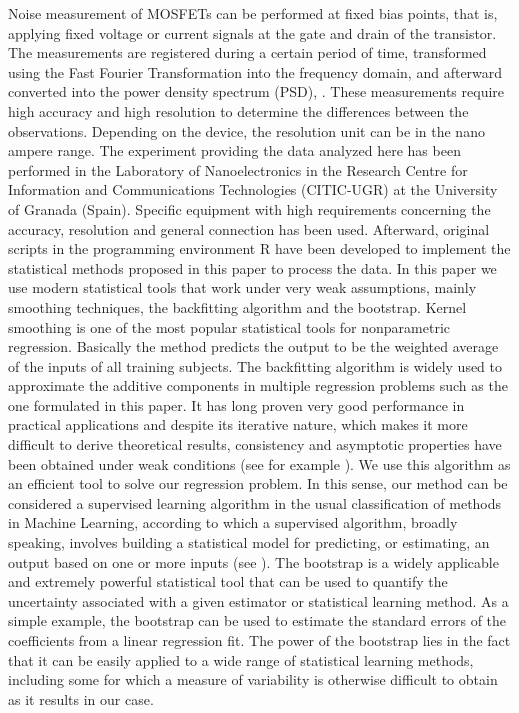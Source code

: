 \documentclass[sn-mathphys]{sn-jnl}%
\theoremstyle{thmstyleone}%
\theoremstyle{thmstyletwo}%
\theoremstyle{thmstylethree}%
\begin{document}
Noise measurement of MOSFETs can be performed at fixed bias points, that is, applying fixed voltage or current signals at the gate and drain of the transistor. The measurements are registered during  a certain period of time, transformed using the Fast Fourier Transformation into the frequency domain, and afterward converted into the power density spectrum (PSD), \cite{Duty2016}. These measurements require high accuracy and high resolution to determine the differences between the observations. Depending on the device, the resolution unit can be in the nano ampere range. The experiment providing the data analyzed here  has been performed in the Laboratory of Nanoelectronics in the Research Centre for Information and Communications Technologies (CITIC-UGR) at the University of Granada (Spain). Specific equipment with high requirements concerning the accuracy, resolution and general connection has been used. Afterward, original scripts in the programming environment R have been developed to implement the statistical methods proposed in this paper to process the data. 
In this paper we use modern statistical tools that work under very weak assumptions, mainly smoothing techniques, the backfitting algorithm and the bootstrap. Kernel smoothing is one of the most popular  statistical tools for nonparametric regression. Basically the method predicts the output to be the weighted average of the inputs of all training subjects. 
The backfitting algorithm is widely used to approximate the additive components in multiple regression problems such as the one formulated in this paper. It has long proven very good performance in practical applications and despite its iterative nature, which makes it more difficult to derive theoretical results, consistency and asymptotic properties have been obtained under weak conditions (see for example \cite{MLN1999}). We use this algorithm as an efficient tool to solve our regression problem. In this sense, our method can be considered a supervised learning algorithm in the usual classification of methods in Machine Learning, according to which a supervised algorithm, broadly speaking, involves building a statistical model for predicting, or estimating, an output based on one or more inputs (see \cite{JWHT2021}). 
The bootstrap is a widely applicable and extremely powerful statistical tool that can be used to quantify the uncertainty associated with a given estimator or statistical learning method. As a simple example, the bootstrap can be used to estimate the standard errors of the coefficients from a linear regression fit. The power of the bootstrap lies in the fact that it can be easily applied to a wide range of statistical learning methods, including some for which a measure of variability is otherwise difficult to obtain as it results in our case.\ 
\end{document}
